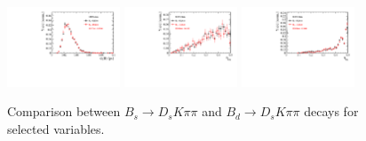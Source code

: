 \begin{figure}[h]
\includegraphics[height=!,width=0.3\textwidth]{figs/dataVsMC/B0vsBs_signal/Ds2all_Bs_BsDTF_TAUERR.pdf}
\includegraphics[height=!,width=0.3\textwidth]{figs/dataVsMC/B0vsBs_signal/Ds2all_OS_Combination_PROB.pdf}
\includegraphics[height=!,width=0.3\textwidth]{figs/dataVsMC/B0vsBs_signal/Ds2all_SS_Kaon_PROB.pdf}

\caption{Comparison between $B_s \to D_s K \pi \pi$ and $B_d \to D_s K \pi \pi$ decays for selected variables.}

\end{figure}

%
%
%
%
%


